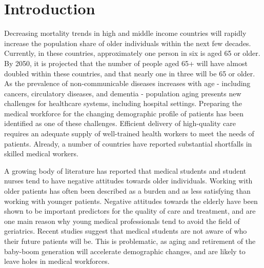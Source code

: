 

\newpage


\section{Introduction}

Decreasing mortality trends in high and middle income countries will 
rapidly increase the population share of older individuals within the 
next few decades.\citep{kontis2017future} Currently, in these countries, 
approximately one person in six is aged 65 or older. By 2050, it is projected 
that the number of people aged 65+ will have almost doubled within these 
countries, and that nearly one in three will be 65 or older.\citep{desa2017world}
As the prevalence of non-communicable diseases increases with age - including 
cancers,\citep{campisi2013aging} circulatory diseases,\citep{leening2014sex} 
and dementia\citep{rasmussen2018absolute} - population aging presents new 
challenges for healthcare systems, including hospital settings.\citep{beard2015towards,
pallin2014us} Preparing the medical workforce for the changing demographic 
profile of patients has been identified as one of these challenges.\citep{bodenheimer2009confronting} 
Efficient delivery of high-quality care requires an adequate supply of 
well-trained health workers to meet the needs of patients. Already, a number 
of countries have reported substantial shortfalls in skilled medical workers.\citep{darzi2016global}

A growing body of literature has reported that medical students and 
student nurses tend to have negative attitudes towards older individuals.\citep{samra2015medical,
kusumastuti2017contact,fisher2018pejorative} Working with older patients has 
often been described as a burden and as less satisfying than working with 
younger patients. Negative attitudes towards the elderly have been shown to 
be important predictors for the quality of care and treatment,\citep{wilson2018medical} 
and are one main reason why young medical professionals tend to avoid the 
field of geriatrics.\citep{hughes2008medical} Recent studies suggest that 
medical students are not aware of who their future patients will be.\citep{kusumastuti2017contact} 
This is problematic, as aging and retirement of the baby-boom generation will 
accelerate demographic changes, and are likely to leave holes in medical 
workforces.\citep{schofield2006demographic}

